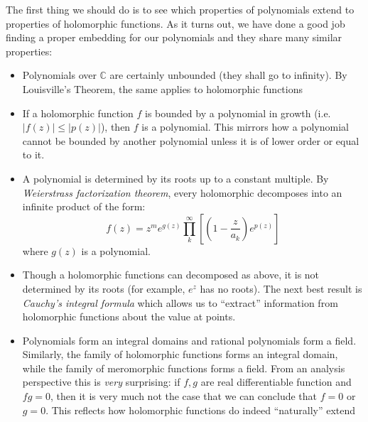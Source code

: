 \documentclass[oneside]{article}
\newcommand{\C}{\mathbb{C}}
\newcommand{\CP}{\mathbb{C}\mathrm{P}}
\begin{document}
The first thing we should do is to see which properties of polynomials extend to properties of holomorphic
functions. As it turns out, we have done a good job finding a proper embedding for our polynomials and they
share many similar properties:
\begin{itemize}
  \item Polynomials over $\C$ are certainly unbounded (they shall go to infinity). By Louisville's Theorem, the
    same applies to holomorphic functions
  \item If a holomorphic function $f$ is bounded by a polynomial in growth (i.e. $|f(z)| \le |p(z)|$), then
    $f$ is a polynomial. This mirrors how a polynomial cannot be bounded by another polynomial unless it is of
    lower order or equal to it.
  \item A polynomial is determined by its roots up to a constant multiple. By \emph{Weierstrass factorization
    theorem}, every holomorphic decomposes into an infinite product of the form:
    \[
      f(z) = z^me^{g(z)}\prod_k^{\infty} \left[\left(1 - \frac{z}{a_k}\right)e^{p(z)}\right]
    \]
    where $g(z)$ is a polynomial.
  \item Though a holomorphic functions can decomposed as above, it is not determined by its roots (for example, $e^z$ has no
    roots). The next best result is  \emph{Cauchy's integral formula} which allows us to ``extract''
    information from holomorphic functions about the value at points.
    \item Polynomials form an integral domains and rational polynomials form a field. Similarly, the family of
      holomorphic functions forms an integral domain, while the family of meromorphic functions forms a field.
      From an analysis perspective this is \emph{very} surprising: if $f,g$
      are real differentiable function and $fg = 0$, then it is very much not the case that we can conclude
      that $f = 0$ or $g = 0$. This reflects how holomorphic functions do indeed ``naturally'' extend

\end{itemize}
\end{document}
